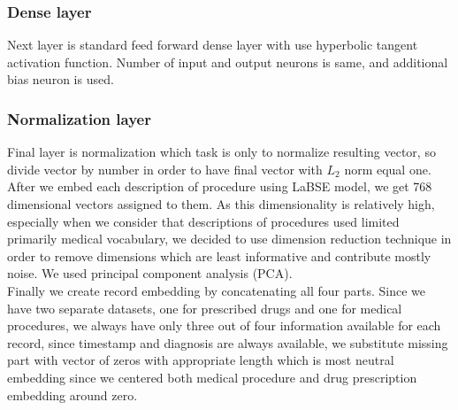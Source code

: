 \subsubsection{Dense layer}

Next layer is standard feed forward dense layer with use hyperbolic tangent activation function. Number of input and output neurons is same, and additional bias neuron is used.

\subsubsection{Normalization layer}

Final layer is normalization which task is only to normalize resulting vector, so divide vector by number in order to have final vector with $L_2$ norm equal one.
\\

After we embed each description of procedure using LaBSE model, we get 768 dimensional vectors assigned to them. As this dimensionality is relatively high, especially when we consider that descriptions of procedures used limited primarily medical vocabulary, we decided to use dimension reduction technique in order to remove dimensions which are least informative and contribute mostly noise. We used principal component analysis (PCA).
\\

Finally we create record embedding by concatenating all four parts. Since we have two separate datasets, one for prescribed drugs and one for medical procedures, we always have only three out of four information available for each record, since timestamp and diagnosis are always available, we substitute missing part with vector of zeros with appropriate length which is most neutral embedding since we centered both medical procedure and drug prescription embedding around zero.
